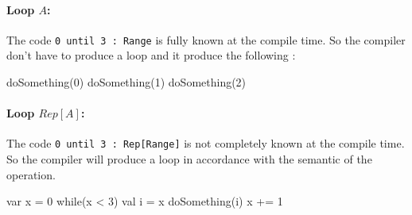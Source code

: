 \paragraph{Loop $A$:}

The code \texttt{0 until 3 : Range} is fully known at the compile time. So
the compiler don't have to produce a loop and it produce the following :
\begin{scalacode}
doSomething(0)
doSomething(1)
doSomething(2)
\end{scalacode}

\paragraph{Loop $Rep[A]$:}

The code \texttt{0 until 3 : Rep[Range]} is not completely known at
the compile time. So the compiler will produce a loop in accordance with the
semantic of the operation.
\begin{scalacode}
var x = 0
while(x < 3) {
  val i = x
	doSomething(i)
	x += 1
}
\end{scalacode}

